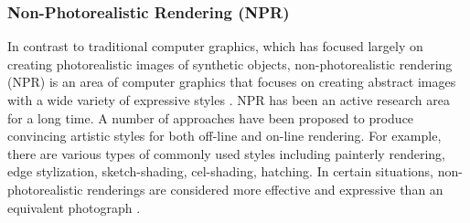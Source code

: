 


\subsubsection{Non-Photorealistic Rendering (NPR)}
In contrast to traditional computer graphics, which has focused largely on creating photorealistic images of synthetic objects, non-photorealistic rendering (NPR) is an area of computer graphics that focuses on creating abstract images with a wide variety of expressive styles \cite{haeberli_paint_1990}. NPR has been an active research area for a long time. A number of approaches have been proposed to produce convincing artistic styles for both off-line and on-line rendering. For example, there are various types of commonly used styles including painterly rendering, edge stylization, sketch-shading, cel-shading, hatching.
In certain situations, non-photorealistic renderings are considered more effective and expressive than an equivalent photograph \cite{healey_perceptually_2004}.


